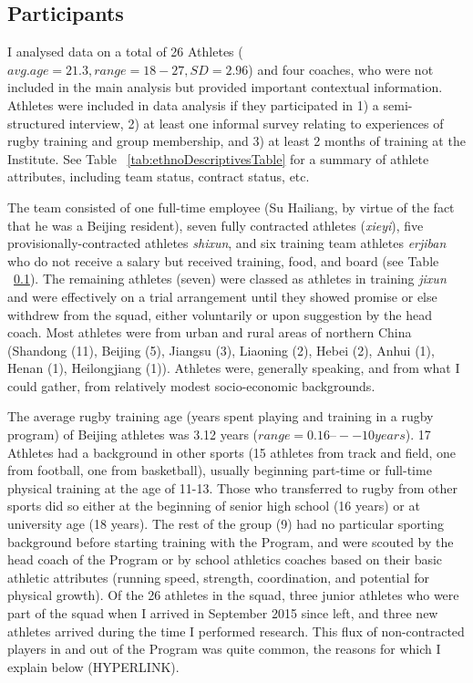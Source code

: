 \subsection{Participants}
I analysed data on a total of 26 Athletes ($avg. age = 21.3, range = 18-27, SD = 2.96$) and four coaches, who were not included in the main analysis but provided important contextual information.  Athletes were included in data analysis if they participated in 1) a semi-structured interview, 2) at least one informal survey relating to experiences of rugby training and group membership, and 3) at least 2 months of training at the Institute.  See Table ~\ref{tab:ethnoDescriptivesTable} for a summary of athlete attributes, including team status, contract status, etc.



The team consisted of one full-time employee (Su Hailiang, by virtue of the fact that he was a Beijing resident), seven fully contracted athletes (\textit{xieyi}), five provisionally-contracted athletes \textit{shixun}, and six training team athletes \textit{erjiban} who do not receive a salary but received training, food, and board (see Table ~\ref{}).  The remaining athletes (seven) were classed as athletes in training \textit{jixun} and were effectively on a trial arrangement until they showed promise or else withdrew from the squad, either voluntarily or upon suggestion by the head coach.  Most athletes were from urban and rural areas of northern China (Shandong (11), Beijing (5), Jiangsu (3), Liaoning (2), Hebei (2), Anhui (1), Henan (1), Heilongjiang (1)). Athletes were, generally speaking, and from what I could gather, from relatively modest socio-economic backgrounds.

The average rugby training age (years spent playing and training in a rugby program) of Beijing athletes was 3.12 years ($range = 0.16 –-- 10 years$).  17 Athletes had a background in other sports (15 athletes from track and field, one from football, one from basketball), usually beginning part-time or full-time physical training at the age of 11-13.  Those who transferred to rugby from other sports did so either at the beginning of senior high school (16 years) or at university age (18 years).  The rest of the group (9) had no particular sporting background before starting training with the Program, and were scouted by the head coach of the Program or by school athletics coaches based on their basic athletic attributes (running speed, strength, coordination, and potential for physical growth).  Of the 26 athletes in the squad, three junior athletes who were part of the squad when I arrived in September 2015 since left, and three new athletes arrived during the time I performed research. This flux of non-contracted players in and out of the Program was quite common, the reasons for which I explain below (HYPERLINK).

